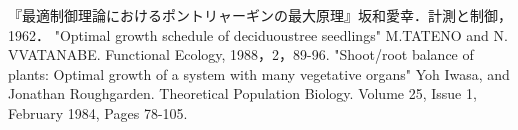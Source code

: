 \documentclass[uplatex, dvipdfmx]{jsarticle}
\begin{document}
\begin{thebibliography}{99}
        『最適制御理論におけるポントリャーギンの最大原理』坂和愛幸．計測と制御，1962．
        "Optimal growth schedule of deciduoustree seedlings" M.TATENO and N. VVATANABE. Functional Ecology, 1988，2，89-96.
        "Shoot/root balance of plants: Optimal growth of a system with many vegetative organs" Yoh Iwasa, and Jonathan Roughgarden. 
        Theoretical Population Biology. Volume 25, Issue 1, February 1984, Pages 78-105. 
\end{thebibliography}
\end{document}
